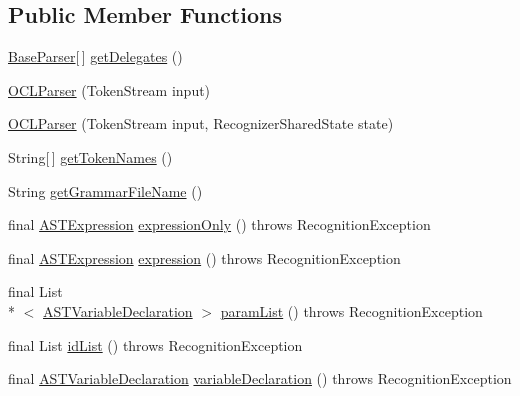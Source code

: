 \subsection*{Public Member Functions}
\begin{DoxyCompactItemize}
\item 
\hyperlink{classorg_1_1tzi_1_1use_1_1parser_1_1base_1_1_base_parser}{Base\-Parser}\mbox{[}$\,$\mbox{]} \hyperlink{classorg_1_1tzi_1_1use_1_1parser_1_1ocl_1_1_o_c_l_parser_ab0b7b1bf973bdfceab9f22765a421e86}{get\-Delegates} ()
\item 
\hyperlink{classorg_1_1tzi_1_1use_1_1parser_1_1ocl_1_1_o_c_l_parser_a0698d3bc1e49a2d7695ad589fda28723}{O\-C\-L\-Parser} (Token\-Stream input)
\item 
\hyperlink{classorg_1_1tzi_1_1use_1_1parser_1_1ocl_1_1_o_c_l_parser_a3150b16ebe1227a476fd214865fb9cba}{O\-C\-L\-Parser} (Token\-Stream input, Recognizer\-Shared\-State state)
\item 
String\mbox{[}$\,$\mbox{]} \hyperlink{classorg_1_1tzi_1_1use_1_1parser_1_1ocl_1_1_o_c_l_parser_a97176d6352f5f1d27c02f2e68d5f8db7}{get\-Token\-Names} ()
\item 
String \hyperlink{classorg_1_1tzi_1_1use_1_1parser_1_1ocl_1_1_o_c_l_parser_a74946f9f3741445ad36c6a515c1b3dfe}{get\-Grammar\-File\-Name} ()
\item 
final \hyperlink{classorg_1_1tzi_1_1use_1_1parser_1_1ocl_1_1_a_s_t_expression}{A\-S\-T\-Expression} \hyperlink{classorg_1_1tzi_1_1use_1_1parser_1_1ocl_1_1_o_c_l_parser_ae7d9232cd6d85c335c8e8771a3934190}{expression\-Only} ()  throws Recognition\-Exception 
\item 
final \hyperlink{classorg_1_1tzi_1_1use_1_1parser_1_1ocl_1_1_a_s_t_expression}{A\-S\-T\-Expression} \hyperlink{classorg_1_1tzi_1_1use_1_1parser_1_1ocl_1_1_o_c_l_parser_a68116d5b1b44e6505ba618792ece3b25}{expression} ()  throws Recognition\-Exception 
\item 
final List\\*
$<$ \hyperlink{classorg_1_1tzi_1_1use_1_1parser_1_1ocl_1_1_a_s_t_variable_declaration}{A\-S\-T\-Variable\-Declaration} $>$ \hyperlink{classorg_1_1tzi_1_1use_1_1parser_1_1ocl_1_1_o_c_l_parser_af1cfb1da48c940a046919c2e3c38d3e6}{param\-List} ()  throws Recognition\-Exception 
\item 
final List \hyperlink{classorg_1_1tzi_1_1use_1_1parser_1_1ocl_1_1_o_c_l_parser_ad07feab68237fcbb959849ec28c525f9}{id\-List} ()  throws Recognition\-Exception 
\item 
final \hyperlink{classorg_1_1tzi_1_1use_1_1parser_1_1ocl_1_1_a_s_t_variable_declaration}{A\-S\-T\-Variable\-Declaration} \hyperlink{classorg_1_1tzi_1_1use_1_1parser_1_1ocl_1_1_o_c_l_parser_a5d61cc8a0cb6f583a7d34d459dce4b4a}{variable\-Declaration} ()  throws Recognition\-Exception 

\end{DoxyCompactItemize}
